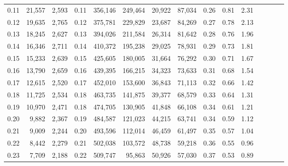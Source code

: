 \begin{tabular}{rrrcrrrrrrrrrrr}
0.11 &  21,557 &  2,593 &                                       0.11 &  356,146 &  249,464 &   20,922 &   87,034 &  0.26 &  0.81 &                         2.31 \\
0.12 &  19,635 &  2,765 &                                       0.12 &  375,781 &  229,829 &   23,687 &   84,269 &  0.27 &  0.78 &                         2.13 \\
0.13 &  18,245 &  2,627 &                                       0.13 &  394,026 &  211,584 &   26,314 &   81,642 &  0.28 &  0.76 &                         1.96 \\
0.14 &  16,346 &  2,711 &                                       0.14 &  410,372 &  195,238 &   29,025 &   78,931 &  0.29 &  0.73 &                         1.81 \\
0.15 &  15,233 &  2,639 &                                       0.15 &  425,605 &  180,005 &   31,664 &   76,292 &  0.30 &  0.71 &                         1.67 \\
0.16 &  13,790 &  2,659 &                                       0.16 &  439,395 &  166,215 &   34,323 &   73,633 &  0.31 &  0.68 &                         1.54 \\
0.17 &  12,615 &  2,520 &                                       0.17 &  452,010 &  153,600 &   36,843 &   71,113 &  0.32 &  0.66 &                         1.42 \\
0.18 &  11,725 &  2,534 &                                       0.18 &  463,735 &  141,875 &   39,377 &   68,579 &  0.33 &  0.64 &                         1.31 \\
0.19 &  10,970 &  2,471 &                                       0.18 &  474,705 &  130,905 &   41,848 &   66,108 &  0.34 &  0.61 &                         1.21 \\
0.20 &   9,882 &  2,367 &                                       0.19 &  484,587 &  121,023 &   44,215 &   63,741 &  0.34 &  0.59 &                         1.12 \\
0.21 &   9,009 &  2,244 &                                       0.20 &  493,596 &  112,014 &   46,459 &   61,497 &  0.35 &  0.57 &                         1.04 \\
0.22 &   8,442 &  2,279 &                                       0.21 &  502,038 &  103,572 &   48,738 &   59,218 &  0.36 &  0.55 &                         0.96 \\
0.23 &   7,709 &  2,188 &                                       0.22 &  509,747 &   95,863 &   50,926 &   57,030 &  0.37 &  0.53 &                         0.89 \\

\end{tabular}
